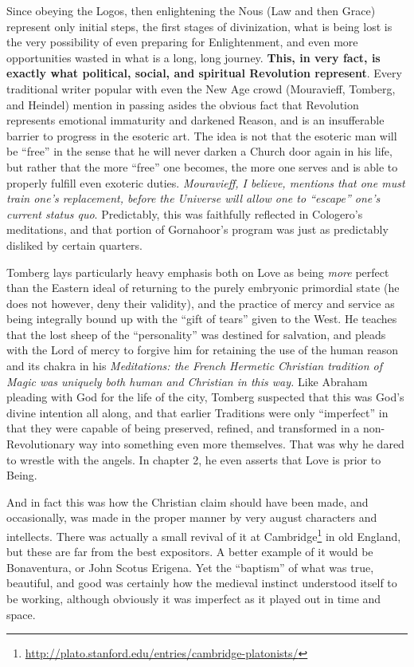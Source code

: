 Since obeying the Logos, then enlightening the Nous (Law and then Grace) represent only initial steps, the first stages of divinization, what is being lost is the very possibility of even preparing for Enlightenment, and even more opportunities wasted in what is a long, long journey.
\textbf{This, in very fact, is exactly what political, social, and spiritual Revolution represent}. Every traditional writer popular with even the New Age crowd (Mouravieff, Tomberg, and Heindel) mention in passing asides the obvious fact that Revolution represents emotional immaturity and darkened Reason, and is an insufferable barrier to progress in the esoteric art. The idea is not that the esoteric man will be ``free'' in the sense that he will never darken a Church door again in his life, but rather that the more ``free'' one becomes, the more one serves and is able to properly fulfill even exoteric duties. \emph{Mouravieff, I believe, mentions that one must train one's replacement, before the Universe will allow one to ``escape'' one's current status quo}. Predictably, this was faithfully reflected in Cologero's meditations, and that portion of Gornahoor's program was just as predictably disliked by certain quarters.

Tomberg lays particularly heavy emphasis both on Love as being \emph{more} perfect than the Eastern ideal of returning to the purely embryonic primordial state (he does not however, deny their validity), and the practice of mercy and service as being integrally bound up with the ``gift of tears'' given to the West. He teaches that the lost sheep of the ``personality'' was destined for salvation, and pleads with the Lord of mercy to forgive him for retaining the use of the human reason and its chakra in his \emph{Meditations: the French Hermetic Christian tradition of Magic was uniquely both human and Christian in this way.} Like Abraham pleading with God for the life of the city, Tomberg suspected that this was God's divine intention all along, and that earlier Traditions were only ``imperfect'' in that they were capable of being preserved, refined, and transformed in a non-Revolutionary way into something even more themselves. That was why he dared to wrestle with the angels. In chapter 2, he even asserts that Love is prior to Being.

And in fact this was how the Christian claim should have been made, and occasionally, was made in the proper manner by very august characters and intellects. There was actually a small revival of it at Cambridge\footnote{\url{http://plato.stanford.edu/entries/cambridge-platonists/}} in old England, but these are far from the best expositors. A better example of it would be Bonaventura, or John Scotus Erigena. Yet the ``baptism'' of what was true, beautiful, and good was certainly how the medieval instinct understood itself to be working, although obviously it was imperfect as it played out in time and space.

